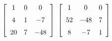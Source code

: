 {$\left[ \begin {array}{ccc} 1&0&0\\\noalign{\medskip}4&1&-7
\\\noalign{\medskip}20&7&-48\end {array} \right] $
 }
{$ \left[ \begin {array}{ccc} 1&0&0\\\noalign{\medskip}52&-48&7
\\\noalign{\medskip}8&-7&1\end {array} \right]$}

